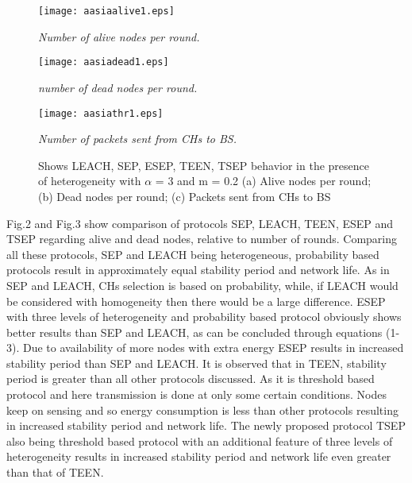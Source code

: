 \documentclass[conference]{IEEEtran}
\begin{document}
\begin{figure}
\begin{center}
\texttt{[image: aasiaalive1.eps]}
\vspace{-0.5cm}
\caption{\small \sl Number of alive nodes per round.\label{fig:Stupendous}}
\end{center}
\end{figure}

\begin{figure}
\begin{center}
\texttt{[image: aasiadead1.eps]}
\vspace{-0.5cm}
\caption{\small \sl number of dead nodes per round.\label{fig:Stupendous}}
\end{center}
\end{figure}
\begin{figure}
\begin{center}
\texttt{[image: aasiathr1.eps]}
\caption{\small \sl Number of packets sent from CHs to BS.\label{fig:Stupendous}}
\end{center}
\end{figure}

\begin{figure}[htb]
  \centering
{}
\caption{Shows LEACH, SEP, ESEP, TEEN, TSEP behavior in the presence of heterogeneity with $\alpha$ = 3 and m = 0.2 (a) Alive nodes per round; (b) Dead nodes per round; (c) Packets sent from CHs to BS}
\end{figure}

Fig.2 and Fig.3 show comparison of protocols SEP, LEACH, TEEN, ESEP and TSEP regarding alive and dead nodes, relative to number of rounds. Comparing all these protocols, SEP and LEACH being heterogeneous, probability based protocols result in approximately equal stability period and network life. As in SEP and LEACH, CHs selection is based on probability, while, if LEACH would be considered with homogeneity then there would be a large difference. ESEP with three levels of heterogeneity and probability based protocol obviously shows better results than SEP and LEACH, as can be concluded through equations (1-3). Due to availability of more nodes with extra energy ESEP results in increased stability period than SEP and LEACH. It is observed that in TEEN, stability period is greater than all other protocols discussed. As it is threshold based protocol and here transmission is done at only some certain conditions. Nodes keep on sensing and so energy consumption is less than other protocols resulting in increased stability period and network life. The newly proposed protocol TSEP also being threshold based protocol with an additional feature of three levels of heterogeneity results in increased stability period and network life even greater than that of TEEN.
\end{document}
